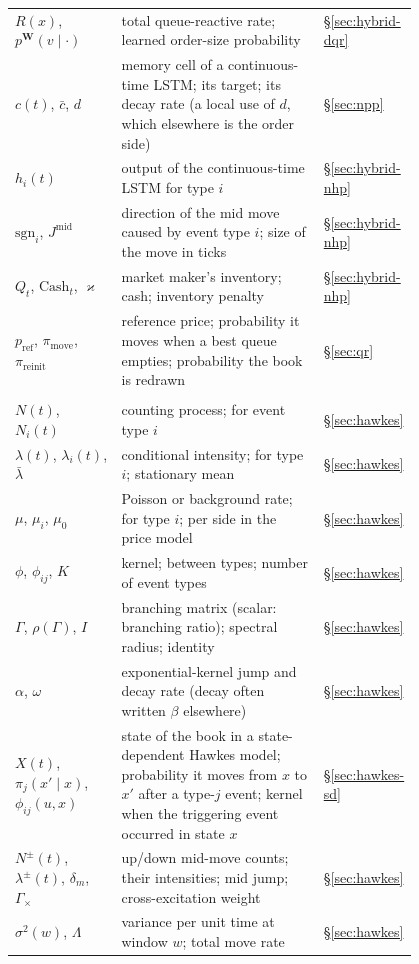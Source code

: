 \begin{center}
\begin{longtable}{>{\raggedright\arraybackslash}p{0.27\linewidth}>{\raggedright\arraybackslash}p{0.53\linewidth}l}
$R(x)$, $p^{\mathbf{W}}(v\mid\cdot)$ & total queue-reactive rate; learned order-size probability & \S\ref{sec:hybrid-dqr} \\
$c(t)$, $\bar c$, $d$ & memory cell of a continuous-time LSTM; its target; its decay rate (a local use of $d$, which elsewhere is the order side) & \S\ref{sec:npp} \\
$h_i(t)$ & output of the continuous-time LSTM for type $i$ & \S\ref{sec:hybrid-nhp} \\
$\mathrm{sgn}_i$, $J^{\text{mid}}$ & direction of the mid move caused by event type $i$; size of the move in ticks & \S\ref{sec:hybrid-nhp} \\
$Q_t$, $\text{Cash}_t$, $\varkappa$ & market maker's inventory; cash; inventory penalty & \S\ref{sec:hybrid-nhp} \\
$p_{\text{ref}}$, $\pi_{\text{move}}$, $\pi_{\text{reinit}}$ & reference price; probability it moves when a best queue empties; probability the book is redrawn & \S\ref{sec:qr} \\
\midrule
\multicolumn{3}{l}{\emph{Point processes}} \\
$N(t)$, $N_i(t)$ & counting process; for event type $i$ & \S\ref{sec:hawkes} \\
$\lambda(t)$, $\lambda_i(t)$, $\bar\lambda$ & conditional intensity; for type $i$; stationary mean & \S\ref{sec:hawkes} \\
$\mu$, $\mu_i$, $\mu_0$ & Poisson or background rate; for type $i$; per side in the price model & \S\ref{sec:hawkes} \\
$\phi$, $\phi_{ij}$, $K$ & kernel; between types; number of event types & \S\ref{sec:hawkes} \\
$\Gamma$, $\rho(\Gamma)$, $I$ & branching matrix (scalar: branching ratio); spectral radius; identity & \S\ref{sec:hawkes} \\
$\alpha$, $\omega$ & exponential-kernel jump and decay rate (decay often written $\beta$ elsewhere) & \S\ref{sec:hawkes} \\
$X(t)$, $\pi_j(x'\mid x)$, $\phi_{ij}(u, x)$ & state of the book in a state-dependent Hawkes model; probability it moves from $x$ to $x'$ after a type-$j$ event; kernel when the triggering event occurred in state $x$ & \S\ref{sec:hawkes-sd} \\
$N^{\pm}(t)$, $\lambda^{\pm}(t)$, $\delta_m$, $\Gamma_\times$ & up/down mid-move counts; their intensities; mid jump; cross-excitation weight & \S\ref{sec:hawkes} \\
$\sigma^2(w)$, $\Lambda$ & variance per unit time at window $w$; total move rate & \S\ref{sec:hawkes} \\

\end{longtable}
\end{center}
